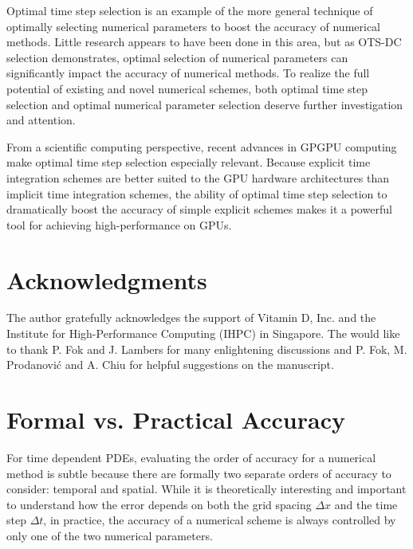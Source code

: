 \documentclass[fleqn,12pt,twoside]{article}
\def\dt{\Delta t}
\def\dx{\Delta x}
\begin{document}
Optimal time step selection is an example of the more general technique
of optimally selecting numerical parameters to boost the accuracy of 
numerical methods.  Little research appears to have been done in this area,
but as OTS-DC selection demonstrates, optimal selection of numerical 
parameters can significantly impact the accuracy of numerical methods.  To 
realize the full potential of existing and novel numerical schemes, 
both optimal time step selection and optimal numerical parameter selection 
deserve further investigation and attention.

From a scientific computing perspective, recent advances in GPGPU computing
make optimal time step selection especially relevant.  Because explicit time
integration schemes are better suited to the GPU hardware architectures than
implicit time integration schemes, the ability of optimal time step selection
to dramatically boost the accuracy of simple explicit schemes makes it a
powerful tool for achieving high-performance on GPUs.  


\section*{Acknowledgments}
The author gratefully acknowledges the support of Vitamin D, Inc.
and the Institute for High-Performance Computing (IHPC) in Singapore. 
The would like to thank P. Fok and J. Lambers for many enlightening 
discussions and P. Fok, M. Prodanovi\'c and A. Chiu for helpful suggestions 
on the manuscript.  


\appendix
\section{Formal vs. Practical Accuracy
         \label{app:formal_vs_practical_accuracy} }
For time dependent PDEs, evaluating the order of accuracy for a numerical
method is subtle because there are formally two separate orders of accuracy 
to consider:  temporal and spatial.  While it is theoretically
interesting and important to understand how the error depends on both the 
grid spacing $\dx$ and the time step $\dt$, in practice, the accuracy 
of a numerical scheme is always controlled by only one of the two numerical
parameters.  
\end{document}
